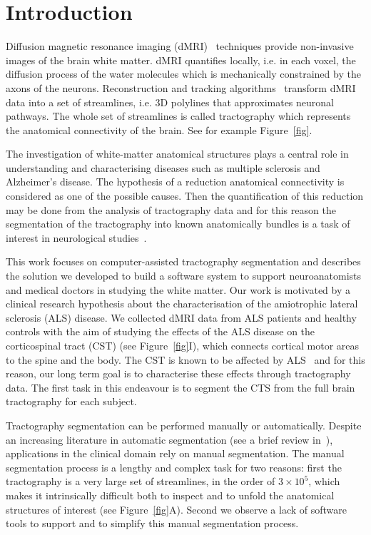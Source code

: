 \section{Introduction}
\label{sec:introduction}

Diffusion magnetic resonance imaging
(dMRI)~\cite{basser1994mr,tuch2002high} techniques provide
non-invasive images of the brain white matter. dMRI quantifies
locally, i.e. in each voxel, the diffusion process of the water
molecules which is mechanically constrained by the axons of the
neurons. Reconstruction and tracking algorithms~\cite{mori2002fiber}
transform dMRI data into a set of streamlines, i.e. 3D polylines that
approximates neuronal pathways. The whole set of streamlines is called
tractography which represents the anatomical connectivity of the
brain. See for example Figure~\ref{fig}.

The investigation of white-matter anatomical structures plays a
central role in understanding and characterising diseases such as
multiple sclerosis and Alzheimer's disease. The hypothesis of a
reduction anatomical connectivity is considered as one of the possible
causes. Then the quantification of this reduction may be done from the
analysis of tractography data and for this reason the segmentation of
the tractography into known anatomically bundles is a task of interest
in neurological studies~\cite{clayden2009reproducibility}.

This work focuses on computer-assisted tractography segmentation and
describes the solution we developed to build a software system to
support neuroanatomists and medical doctors in studying the white
matter. Our work is motivated by a clinical research hypothesis about
the characterisation of the amiotrophic lateral sclerosis (ALS)
disease. We collected dMRI data from ALS patients and healthy controls
with the aim of studying the effects of the ALS disease on the
corticospinal tract (CST) (see Figure~\ref{fig}I), which connects
cortical motor areas to the spine and the body. The CST is known to be
affected by ALS~\cite{cosottini2010evaluation,sage2009quantitative}
and for this reason, our long term goal is to characterise these
effects through tractography data. The first task in this endeavour is
to segment the CTS from the full brain tractography for each subject.

Tractography segmentation can be performed manually or
automatically. Despite an increasing literature in automatic
segmentation (see a brief review
in~\cite{wang2011tractography,olivetti2011supervised}), applications
in the clinical domain rely on manual segmentation. The manual
segmentation process is a lengthy and complex task for two reasons:
first the tractography is a very large set of streamlines, in the
order of $3 \times 10^5$, which makes it intrinsically difficult both
to inspect and to unfold the anatomical structures of interest (see
Figure~\ref{fig}A). Second we observe a lack of software tools to
support and to simplify this manual segmentation process.

